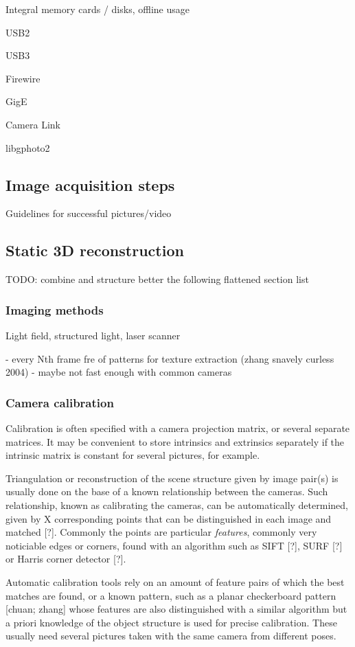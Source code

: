 Integral memory cards / disks, offline usage

USB2

USB3

Firewire

GigE

Camera Link

libgphoto2

\subsection{Image acquisition steps}

Guidelines for successful pictures/video

\subsection{Static 3D reconstruction}

TODO: combine and structure better the following flattened section list

\subsubsection{Imaging methods}

Light field, structured light, laser scanner

- every Nth frame fre of patterns for texture extraction (zhang snavely curless 2004)
- maybe not fast enough with common cameras

\subsubsection{Camera calibration}

Calibration is often specified with a camera projection matrix, or several separate matrices. It may be convenient to store intrinsics and extrinsics separately if the intrinsic matrix is constant for several pictures, for example.

Triangulation or reconstruction of the scene structure given by image pair(s) is usually done on the base of a known relationship between the cameras. Such relationship, known as calibrating the cameras, can be automatically determined, given by X corresponding points that can be distinguished in each image and matched [?]. Commonly the points are particular \emph{features}, commonly very noticiable edges or corners, found with an algorithm such as SIFT [?], SURF [?] or Harris corner detector [?].

Automatic calibration tools rely on an amount of feature pairs of which the best matches are found, or a known pattern, such as a planar checkerboard pattern [chuan; zhang] whose features are also distinguished with a similar algorithm but a priori knowledge of the object structure is used for precise calibration. These usually need several pictures taken with the same camera from different poses.

